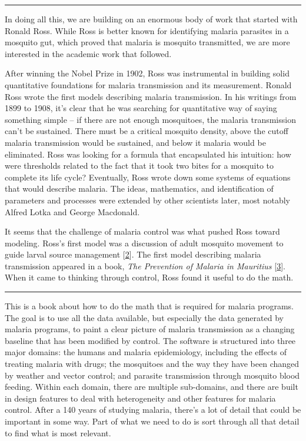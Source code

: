 \documentclass[
]{book}
\begin{document}
\begin{center}\rule{0.5\linewidth}{0.5pt}\end{center}

In doing all this, we are building on an enormous body of work that started with Ronald Ross. While Ross is better known for identifying malaria parasites in a mosquito gut, which proved that malaria is mosquito transmitted, we are more interested in the academic work that followed.

After winning the Nobel Prize in 1902, Ross was instrumental in building solid quantitative foundations for malaria transmission and its measurement. Ronald Ross wrote the first models describing malaria transmission. In his writings from 1899 to 1908, it's clear that he was searching for quantitative way of saying something simple -- if there are not enough mosquitoes, the malaria transmission can't be sustained. There must be a critical mosquito density, above the cutoff malaria transmission would be sustained, and below it malaria would be eliminated. Ross was looking for a formula that encapsulated his intuition: how were thresholds related to the fact that it took two bites for a mosquito to complete its life cycle? Eventually, Ross wrote down some systems of equations that would describe malaria. The ideas, mathematics, and identification of parameters and processes were extended by other scientists later, most notably Alfred Lotka and George Macdonald.

It seems that the challenge of malaria control was what pushed Ross toward modeling. Ross's first model was a discussion of adult mosquito movement to guide larval source management {[}\protect\hyperlink{ref-RossR1905LogicalBasis}{2}{]}. The first model describing malaria transmission appeared in a book, \emph{The Prevention of Malaria in Mauritius} {[}\protect\hyperlink{ref-RossR1908ReportPrevention}{3}{]}. When it came to thinking through control, Ross found it useful to do the math.

\begin{center}\rule{0.5\linewidth}{0.5pt}\end{center}

This is a book about how to do the math that is required for malaria programs. The goal is to use all the data available, but especially the data generated by malaria programs, to paint a clear picture of malaria transmission as a changing baseline that has been modified by control. The software is structured into three major domains: the humans and malaria epidemiology, including the effects of treating malaria with drugs; the mosquitoes and the way they have been changed by weather and vector control; and parasite transmission through mosquito blood feeding. Within each domain, there are multiple sub-domains, and there are built in design features to deal with heterogeneity and other features for malaria control. After a 140 years of studying malaria, there's a lot of detail that could be important in some way. Part of what we need to do is sort through all that detail to find what is most relevant.
\end{document}
